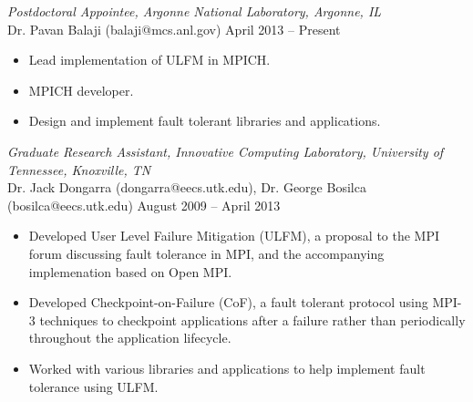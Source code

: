 {\sl Postdoctoral Appointee, Argonne National Laboratory, Argonne, IL} \\
Dr. Pavan Balaji (balaji@mcs.anl.gov) \hfill April 2013 -- Present
\begin{itemize} \itemsep -2pt
        \item Lead implementation of ULFM in MPICH.
        \item MPICH developer.
        \item Design and implement fault tolerant libraries and applications.
\end{itemize}

{\sl Graduate Research Assistant, Innovative Computing Laboratory, University
of Tennessee, Knoxville, TN} \\
Dr. Jack Dongarra (dongarra@eecs.utk.edu), Dr. George Bosilca
(bosilca@eecs.utk.edu) \hfill August 2009 -- April 2013 
\begin{itemize} \itemsep -2pt %
        \item Developed User Level Failure Mitigation (ULFM), a proposal to
            the MPI forum discussing fault tolerance in MPI, and the
            accompanying implemenation based on Open MPI.
        \item Developed Checkpoint-on-Failure (CoF), a fault tolerant protocol
            using MPI-3 techniques to checkpoint applications after a failure
            rather than periodically throughout the application lifecycle.
        \item Worked with various libraries and applications to help
            implement fault tolerance using ULFM.
\end{itemize}

